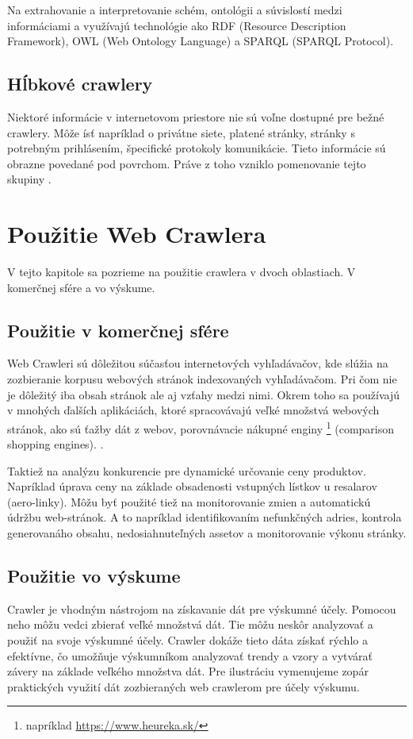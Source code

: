 Na extrahovanie a interpretovanie schém, ontológii a  súvislostí medzi informáciami a využívajú technológie ako RDF (Resource Description Framework), OWL (Web Ontology Language) a SPARQL (SPARQL Protocol)\cite{ontologies}.

\subsection{Hĺbkové crawlery}
Niektoré informácie v internetovom priestore nie sú voľne dostupné pre bežné crawlery. Môže ísť napríklad o privátne siete, platené stránky, stránky s potrebným prihlásením, špecifické protokoly komunikácie. Tieto informácie sú obrazne povedané pod povrchom. Práve z toho vzniklo pomenovanie tejto skupiny \cite{deepSearch}. 

\section{Použitie Web Crawlera}
V tejto kapitole sa pozrieme na použitie crawlera v dvoch oblastiach. V komerčnej sfére a vo výskume.


\subsection{Použitie v komerčnej sfére}
Web Crawleri sú dôležitou súčasťou internetových vyhľadávačov, kde slúžia na zozbieranie korpusu webových stránok indexovaných vyhľadávačom. Pri čom nie je dôležitý iba obsah stránok ale aj vzťahy medzi nimi. Okrem toho sa používajú v mnohých ďalších aplikáciách, ktoré spracovávajú veľké množstvá webových stránok, ako sú ťažby dát z webov, porovnávacie nákupné enginy \footnote{ napríklad \url{https://www.heureka.sk/}} (comparison shopping engines). \cite{encykOfDatabases}.  

Taktiež na analýzu konkurencie pre dynamické určovanie ceny produktov. Napríklad úprava ceny na základe obsadenosti vstupných lístkov u resalarov (aero-linky). 
Môžu byť použité tiež na monitorovanie zmien a automatickú údržbu web-stránok. A to napríklad identifikovaním nefunkčných adries, kontrola generovanáho obsahu, nedosiahnuteľných assetov a monitorovanie výkonu stránky. \cite{crawlPageTesting}

\subsection{Použitie vo výskume}
Crawler je vhodným nástrojom na získavanie dát pre výskumné účely. Pomocou neho môžu vedci zbierať veľké množstvá dát. Tie môžu neskôr analyzovať a použiť na svoje výskumné účely. Crawler dokáže tieto dáta získať rýchlo a efektívne, čo umožňuje výskumníkom analyzovať trendy a vzory a vytvárať závery na základe veľkého množstva dát. Pre ilustráciu vymenujeme zopár praktických využití dát zozbieraných web crawlerom pre účely výskumu. 

